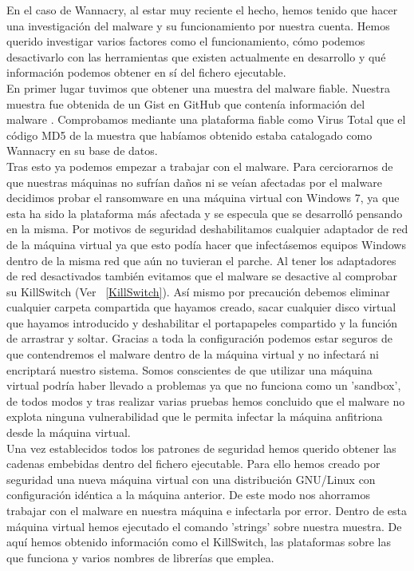 En el caso de Wannacry, al estar muy reciente el hecho, hemos tenido que hacer una investigación del malware y su funcionamiento por nuestra cuenta. Hemos querido investigar varios factores como el funcionamiento, cómo podemos desactivarlo con las herramientas que existen actualmente en desarrollo y qué información podemos obtener en sí del fichero ejecutable.\\
En primer lugar tuvimos que obtener una muestra del malware fiable. Nuestra muestra fue obtenida de un Gist en GitHub que contenía información del malware \cite{killswitch-situacion-4}. Comprobamos mediante una plataforma fiable como Virus Total que el código MD5 de la muestra que habíamos obtenido estaba catalogado como Wannacry en su base de datos.\\
Tras esto ya podemos empezar a trabajar con el malware. Para cerciorarnos de que nuestras máquinas no sufrían daños ni se veían afectadas por el malware decidimos probar el ransomware en una máquina virtual con Windows 7, ya que esta ha sido la plataforma más afectada y se especula que se desarrolló pensando en la misma. Por motivos de seguridad deshabilitamos cualquier adaptador de red de la máquina virtual ya que esto podía hacer que infectásemos equipos Windows dentro de la misma red que aún no tuvieran el parche. Al tener los adaptadores de red desactivados también evitamos que el malware se desactive al comprobar su KillSwitch (Ver ~\ref{KillSwitch}). Así mismo por precaución debemos eliminar cualquier carpeta compartida que hayamos creado, sacar cualquier disco virtual que hayamos introducido y deshabilitar el portapapeles compartido y la función de arrastrar y soltar. Gracias a toda la configuración podemos estar seguros de que contendremos el malware dentro de la máquina virtual y no infectará ni encriptará nuestro sistema. Somos conscientes de que utilizar una máquina virtual podría haber llevado a problemas ya que no funciona como un 'sandbox', de todos modos y tras realizar varias pruebas hemos concluido que el malware no explota ninguna vulnerabilidad que le permita infectar la máquina anfitriona desde la máquina virtual.\\
Una vez establecidos todos los patrones de seguridad hemos querido obtener las cadenas embebidas dentro del fichero ejecutable. Para ello hemos creado por seguridad una nueva máquina virtual con una distribución GNU/Linux con configuración idéntica a la máquina anterior. De este modo nos ahorramos trabajar con el malware en nuestra máquina e infectarla por error. Dentro de esta máquina virtual hemos ejecutado el comando 'strings' sobre nuestra muestra. De aquí hemos obtenido información como el KillSwitch, las plataformas sobre las que funciona y varios nombres de librerías que emplea.\\
